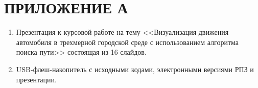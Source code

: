 \chapter*{ПРИЛОЖЕНИЕ А}


\begin{enumerate}
\item Презентация к курсовой работе на тему <<Визуализация движения автомобиля в трехмерной городской среде с использованием алгоритма поиска пути>> состоящая из 16 слайдов.

\item USB-флеш-накопитель с исходными кодами, электронными версиями РПЗ и презентации.
\end{enumerate}
